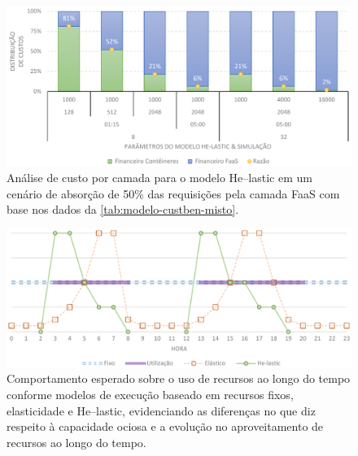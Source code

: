 \documentclass[english,brazilian]{UNISINOSmonografia} %
\newcommand\defaultFigureWidth{0.9}
\begin{document}
\begin{figure}[tb]
	\centering%
	\begin{minipage}{\defaultFigureWidth\textwidth}
		\caption[Análise de custo por camada para o modelo \textsf{He}--lastic em um cenário de absorção de 50\% das requisições pela camada FaaS]{Análise de custo por camada para o modelo \textsf{He}--lastic em um cenário de absorção de 50\% das requisições pela camada FaaS com base nos dados da \autoref{tab:modelo-custben-misto}.}
		\label{fig:modelo-custben-misto}
		\vspace{1ex}
		\includegraphics[width=\textwidth]{modelo-custben-misto}
	\end{minipage}
\end{figure}


\begin{figure}[tb]
	\centering%
	\begin{minipage}{\defaultFigureWidth\textwidth}
		\caption{Comportamento esperado sobre o uso de recursos ao longo do tempo conforme modelos de execução baseado em recursos fixos, elasticidade e \textsf{He}--lastic, evidenciando as diferenças no que diz respeito à capacidade ociosa e a evolução no aproveitamento de recursos ao longo do tempo.}
		\label{fig:modelo-custben-alternativas}
		\includegraphics[width=\textwidth]{modelo-custben-alternativas}
	\end{minipage}
\end{figure}
\end{document}
